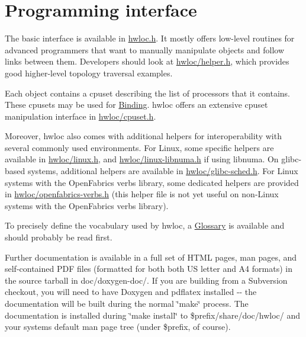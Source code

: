 

\hypertarget{index_interface}{}\section{Programming interface}\label{index_interface}
The basic interface is available in \hyperlink{hwloc_8h_source}{hwloc.h}. It mostly offers low-\/level routines for advanced programmers that want to manually manipulate objects and follow links between them. Developers should look at \hyperlink{helper_8h_source}{hwloc/helper.h}, which provides good higher-\/level topology traversal examples.

Each object contains a cpuset describing the list of processors that it contains. These cpusets may be used for \hyperlink{group__hwlocality__binding}{Binding}. hwloc offers an extensive cpuset manipulation interface in \hyperlink{cpuset_8h_source}{hwloc/cpuset.h}.

Moreover, hwloc also comes with additional helpers for interoperability with several commonly used environments. For Linux, some specific helpers are available in \hyperlink{linux_8h_source}{hwloc/linux.h}, and \hyperlink{linux-libnuma_8h_source}{hwloc/linux-\/libnuma.h} if using libnuma. On glibc-\/based systems, additional helpers are available in \hyperlink{glibc-sched_8h_source}{hwloc/glibc-\/sched.h}. For Linux systems with the OpenFabrics verbs library, some dedicated helpers are provided in \hyperlink{openfabrics-verbs_8h_source}{hwloc/openfabrics-\/verbs.h} (this helper file is not yet useful on non-\/Linux systems with the OpenFabrics verbs library).

To precisely define the vocabulary used by hwloc, a \hyperlink{index_glossary}{Glossary} is available and should probably be read first.

Further documentation is available in a full set of HTML pages, man pages, and self-\/contained PDF files (formatted for both both US letter and A4 formats) in the source tarball in doc/doxygen-\/doc/. If you are building from a Subversion checkout, you will need to have Doxygen and pdflatex installed -\/-\/ the documentation will be built during the normal \char`\"{}make\char`\"{} process. The documentation is installed during \char`\"{}make
install\char`\"{} to \$prefix/share/doc/hwloc/ and your systems default man page tree (under \$prefix, of course).

